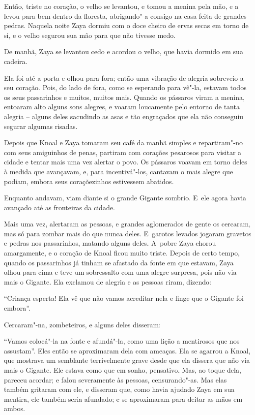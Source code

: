 Então, triste no coração, o velho se levantou, e tomou a menina pela
mão, e a levou para bem dentro da floresta, abrigando"-a consigo na casa
feita de grandes pedras. Naquela noite Zaya dormiu com o doce cheiro de
ervas secas em torno de si, e o velho segurou sua mão para que não
tivesse medo.

De manhã, Zaya se levantou cedo e acordou o velho, que havia dormido em
sua cadeira.

Ela foi até a porta e olhou para fora; então uma vibração de alegria
sobreveio a seu coração. Pois, do lado de fora, como se esperando para
vê"-la, estavam todos os seus passarinhos e muitos, muitos mais. Quando
os pássaros viram a menina, entoaram alto alguns sons alegres, e voaram
loucamente pelo entorno de tanta alegria -- alguns deles sacudindo as
asas e tão engraçados que ela não conseguiu segurar algumas risadas.

Depois que Knoal e Zaya tomaram seu café da manhã simples e
repartiram"-no com seus amiguinhos de penas, partiram com corações
pesarosos para visitar a cidade e tentar mais uma vez alertar o povo. Os
pássaros voavam em torno deles à medida que avançavam, e, para
incentivá"-los, cantavam o mais alegre que podiam, embora seus
coraçõezinhos estivessem abatidos.

Enquanto andavam, viam diante si o grande Gigante sombrio. E~ele agora
havia avançado até as fronteiras da cidade.

Mais uma vez, alertaram as pessoas, e grandes aglomerados de gente os
cercaram, mas só para zombar mais do que nunca deles. E~garotos levados
jogaram gravetos e pedras nos passarinhos, matando alguns deles. A~pobre
Zaya chorou amargamente, e o coração de Knoal ficou muito triste. Depois
de certo tempo, quando os passarinhos já tinham se afastado da fonte em
que estavam, Zaya olhou para cima e teve um sobressalto com uma alegre
surpresa, pois não via mais o Gigante. Ela exclamou de alegria e as
pessoas riram, dizendo:

``Criança esperta! Ela vê que não vamos acreditar nela e finge que o
Gigante foi embora''.

Cercaram"-na, zombeteiros, e alguns deles disseram:

``Vamos colocá"-la na fonte e afundá"-la, como uma lição a mentirosos que
nos assustam''. Eles então se aproximaram dela com ameaças. Ela se
agarrou a Knoal, que mostrava um semblante terrivelmente grave desde que
ela dissera que não via mais o Gigante. Ele estava como que em sonho,
pensativo. Mas, ao toque dela, pareceu acordar; e falou severamente às
pessoas, censurando"-as. Mas elas também gritaram com ele, e disseram
que, como havia ajudado Zaya em sua mentira, ele também seria afundado;
e se aproximaram para deitar as mãos em ambos.


